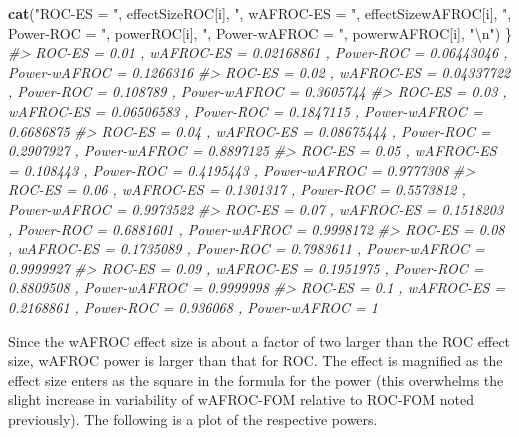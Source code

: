 \documentclass[
]{book}
\newenvironment{Shaded}{\begin{snugshade}}{\end{snugshade}}
\newcommand{\CharTok}[1]{\textcolor[rgb]{0.31,0.60,0.02}{#1}}
\newcommand{\CommentTok}[1]{\textcolor[rgb]{0.56,0.35,0.01}{\textit{#1}}}
\newcommand{\KeywordTok}[1]{\textcolor[rgb]{0.13,0.29,0.53}{\textbf{#1}}}
\newcommand{\NormalTok}[1]{#1}
\newcommand{\StringTok}[1]{\textcolor[rgb]{0.31,0.60,0.02}{#1}}
\begin{document}
\begin{Shaded}
\begin{Highlighting}[]
  \KeywordTok{cat}\NormalTok{(}\StringTok{"ROC{-}ES = "}\NormalTok{, effectSizeROC[i], }\StringTok{", wAFROC{-}ES = "}\NormalTok{, effectSizewAFROC[i], }
      \StringTok{", Power{-}ROC = "}\NormalTok{, powerROC[i], }\StringTok{", Power{-}wAFROC = "}\NormalTok{, powerwAFROC[i], }\StringTok{"}\CharTok{\textbackslash{}n}\StringTok{"}\NormalTok{)}
\NormalTok{\}}
\CommentTok{\#\textgreater{} ROC{-}ES =  0.01 , wAFROC{-}ES =  0.02168861 , Power{-}ROC =  0.06443046 , Power{-}wAFROC =  0.1266316 }
\CommentTok{\#\textgreater{} ROC{-}ES =  0.02 , wAFROC{-}ES =  0.04337722 , Power{-}ROC =  0.108789 , Power{-}wAFROC =  0.3605744 }
\CommentTok{\#\textgreater{} ROC{-}ES =  0.03 , wAFROC{-}ES =  0.06506583 , Power{-}ROC =  0.1847115 , Power{-}wAFROC =  0.6686875 }
\CommentTok{\#\textgreater{} ROC{-}ES =  0.04 , wAFROC{-}ES =  0.08675444 , Power{-}ROC =  0.2907927 , Power{-}wAFROC =  0.8897125 }
\CommentTok{\#\textgreater{} ROC{-}ES =  0.05 , wAFROC{-}ES =  0.108443 , Power{-}ROC =  0.4195443 , Power{-}wAFROC =  0.9777308 }
\CommentTok{\#\textgreater{} ROC{-}ES =  0.06 , wAFROC{-}ES =  0.1301317 , Power{-}ROC =  0.5573812 , Power{-}wAFROC =  0.9973522 }
\CommentTok{\#\textgreater{} ROC{-}ES =  0.07 , wAFROC{-}ES =  0.1518203 , Power{-}ROC =  0.6881601 , Power{-}wAFROC =  0.9998172 }
\CommentTok{\#\textgreater{} ROC{-}ES =  0.08 , wAFROC{-}ES =  0.1735089 , Power{-}ROC =  0.7983611 , Power{-}wAFROC =  0.9999927 }
\CommentTok{\#\textgreater{} ROC{-}ES =  0.09 , wAFROC{-}ES =  0.1951975 , Power{-}ROC =  0.8809508 , Power{-}wAFROC =  0.9999998 }
\CommentTok{\#\textgreater{} ROC{-}ES =  0.1 , wAFROC{-}ES =  0.2168861 , Power{-}ROC =  0.936068 , Power{-}wAFROC =  1}
\end{Highlighting}
\end{Shaded}

Since the wAFROC effect size is about a factor of two larger than the ROC effect size, wAFROC power is larger than that for ROC. The effect is magnified as the effect size enters as the square in the formula for the power (this overwhelms the slight increase in variability of wAFROC-FOM relative to ROC-FOM noted previously). The following is a plot of the respective powers.
\end{document}
